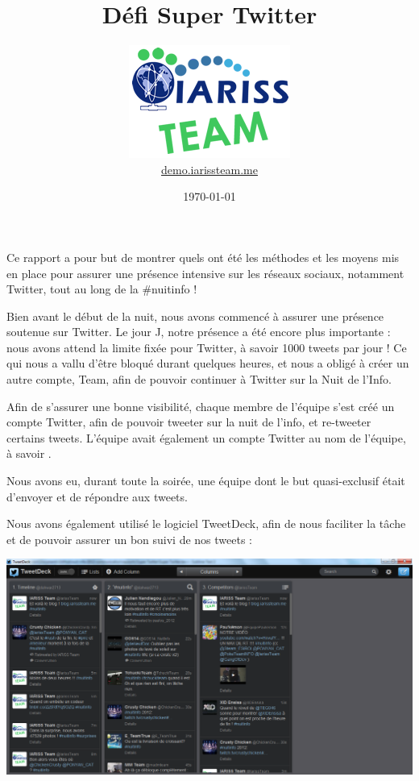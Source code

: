 \documentclass[12pt, a4paper]{article}
\title{Défi Super Twitter}
\newcommand{\espace}{\vspace{.8cm}}
\begin{document}
\author{\includegraphics{../_img/iariss_team.png} \\ {\sffamily \href{http://demo.iarissteam.me}{demo.iarissteam.me}}}
\date{\today}

\maketitle{}

{\sffamily Ce rapport a pour but de montrer quels ont été les méthodes et les moyens mis en place pour assurer une présence intensive sur les réseaux sociaux, notamment Twitter, tout au long de la \#nuitinfo !} 

\espace{}
Bien avant le début de la nuit, nous avons commencé à assurer une présence soutenue sur Twitter. Le jour J, notre présence a été encore plus importante : nous avons attend la limite fixée pour Twitter, à savoir 1000 tweets par jour ! Ce qui nous a vallu d'être bloqué durant quelques heures, et nous a obligé à créer un autre compte, \@TheIariss Team, afin de pouvoir continuer à Twitter sur la Nuit de l'Info.

Afin de s'assurer une bonne visibilité, chaque membre de l'équipe s'est créé un compte Twitter, afin de pouvoir tweeter sur la nuit de l'info, et re-tweeter certains tweets. L'équipe avait également un compte Twitter au nom de l'équipe, à savoir \@IarissTeam.

Nous avons eu, durant toute la soirée, une équipe dont le but quasi-exclusif était d'envoyer et de répondre aux tweets.

Nous avons également utilisé le logiciel TweetDeck, afin de nous faciliter la tâche et de pouvoir assurer un bon suivi de nos tweets : 

\espace{}
\begin{center}
\includegraphics[width=.9\textwidth, keepaspectratio=true]{img/tweetdeck.png}
\end{center}
\espace{}
\end{document}
